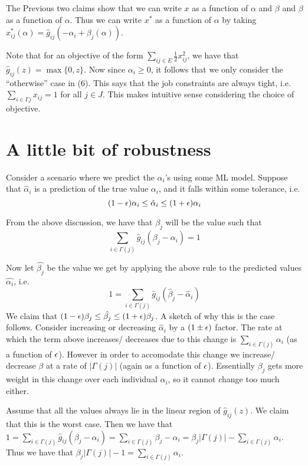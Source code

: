 \documentclass[11pt]{article}
\newcommand{\eps}{\ensuremath \epsilon}
\begin{document}
The Previous two claims show that we can write $x$ as a function of $\alpha$ and $\beta$ and $\beta$ as a function of $\alpha$.  Thus we can write $x^*$ as a function of $\alpha$ by taking $x^*_{ij}(\alpha) = \hat{g}_{ij}(-\alpha_i + \beta_j(\alpha))$.

Note that for an objective of the form $\sum_{ij \in E} \frac{1}{2} x_{ij}^2$, we have that $\hat{g}_{ij}(z) = \max \{0,z\}$.  Now since $\alpha_{i} \geq 0$, it follows that we only consider the ``otherwise'' case in (6).  This says that the job constraints are always tight, i.e. $\sum_{i \in \Gamma{j}} x_{ij} = 1$ for all $j \in J$.   This makes intuitive sense considering the choice of objective.

\section{A little bit of robustness}

Consider a scenario where we predict the $\alpha_{i}$'s using some ML model.  Suppose that $\hat{\alpha}_i$ is a prediction of the true value $\alpha_i$, and it falls within some tolerance, i.e.
\[
(1- \eps) \alpha_i \leq \hat{\alpha}_i \leq (1+\eps) \alpha_i
\]

From the above discussion, we have that $\beta_j$ will be the value such that
\[
\sum_{i \in \Gamma(j)} \hat{g}_{ij} (\beta_j - \alpha_i) = 1
\]

Now let $\hat{\beta_j}$ be the value we get by applying the above rule to the predicted values $\hat{\alpha_i}$, i.e.
\[
1 = \sum_{i \in \Gamma(j)} \hat{g}_{ij} (\hat{\beta}_j - \hat{\alpha}_i)
\]
We claim that $(1-\eps) \beta_j \leq \hat{\beta_j} \leq (1+\eps) \beta_{j}$.  A sketch of why this is the case follows.  Consider increasing or decreasing $\hat{\alpha}_i$ by a $(1 \pm \eps)$ factor.  The rate at which the term above increases/ decreases due to this change is $\sum_{i \in \Gamma(j)} \alpha_i$ (as a function of $\eps$).  However in order to accomodate this change we increase/ decrease $\beta$ at a rate of $|\Gamma(j)|$ (again as a function of $\eps$).  Essentially $\beta_j$ gets more weight in this change over each individual $\alpha_i$, so it cannot change too much either.

Assume that all the values always lie in the linear region of $\hat{g}_{ij}(z)$.  We claim that this is the worst case.  Then we have that $1 = \sum_{i \in \Gamma(j)} \hat{g}_{ij}(\beta_j - \alpha_i) = \sum_{i \in \Gamma(j)} \beta_j - \alpha_i = \beta_j |\Gamma(j)| - \sum_{i \in \Gamma(j)} \alpha_i$.  Thus we have that $\beta_j |\Gamma(j)| -1 = \sum_{i \in \Gamma(j)} \alpha_i$.
\end{document}
